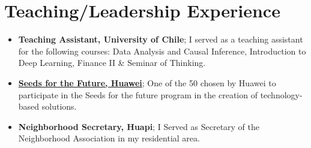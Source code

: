 \documentclass[letterpaper,11pt]{article}
\newcommand{\resumeItem}[2]{
  \item\small{
    \textbf{#1}{#2 \vspace{-2pt}}
  }
}
\newcommand{\resumeSubItem}[2]{\resumeItem{#1}{#2}\vspace{-4pt}}
\newcommand{\resumeSubHeadingListStart}{\begin{itemize}[leftmargin=*]}
\newcommand{\resumeSubHeadingListEnd}{\end{itemize}}
\begin{document}
\section{Teaching/Leadership Experience}
 \resumeSubHeadingListStart
  \resumeSubItem
    {Teaching Assistant, University of Chile}
    {; I served as a teaching assistant for the following courses: Data Analysis and Causal Inference, Introduction to Deep Learning, Finance II \& Seminar of Thinking.}
  \resumeSubItem
    {\href{https://ingenieria.uchile.cl/noticias/188882/estudiantes-fcfm-destacaron-en-5ta-version-del-programa-huawei}{Seeds for the Future, Huawei}}
    {; One of the 50 chosen by Huawei to participate in the Seeds for the future program in the creation of technology-based solutions.}
  \resumeSubItem
    {Neighborhood Secretary, Huapi}
    {; I Served as Secretary of the Neighborhood Association in my residential area.}
  \resumeSubHeadingListEnd
\end{document}
